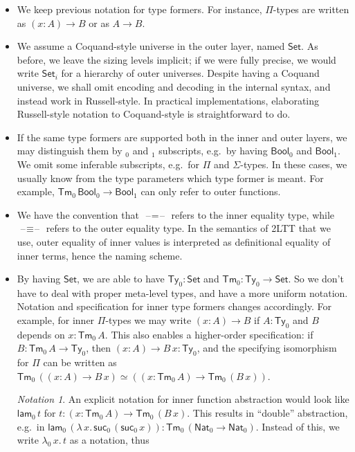 \documentclass[12pt,a4paper,twoside,openany]{book}
\theoremstyle{remark}
\newtheorem{notation}{Notation}
\theoremstyle{definition}
\theoremstyle{theorem}
\newcommand{\ms}[1]{\mathsf{#1}}
\newcommand{\suc}{\ms{suc}}
\newcommand{\Tm}{\mathsf{Tm}}
\newcommand{\Ty}{\mathsf{Ty}}
\newcommand{\blank}{\mathord{\hspace{1pt}\text{--}\hspace{1pt}}}
\newcommand{\Set}{\mathsf{Set}}
\newcommand{\Nat}{\ms{Nat}}
\newcommand{\Bool}{\ms{Bool}}
\newcommand{\lam}{\ms{lam}}
\begin{document}
\begin{itemize}
  \item
    We keep previous notation for type formers. For instance, $\Pi$-types are
    written as $(x : A) \to B$ or as $A \to B$.
  \item
    We assume a Coquand-style universe in the outer layer, named $\Set$. As
    before, we leave the sizing levels implicit; if we were fully precise, we
    would write $\Set_i$ for a hierarchy of outer universes. Despite having a
    Coquand universe, we shall omit encoding and decoding in the internal
    syntax, and instead work in Russell-style. In practical implementations,
    elaborating Russell-style notation to Coquand-style is straightforward to
    do.
  \item
    If the same type formers are supported both in the inner and outer layers, we
    may distinguish them by $_0$ and $_1$ subscripts, e.g.\ by having $\Bool_0$ and
    $\Bool_1$. We omit some inferable subscripts, e.g.\ for $\Pi$ and
    $\Sigma$-types. In these cases, we usually know from the type parameters which
    type former is meant. For example, $\Tm_0\,\Bool_0 \to \Bool_1$ can only refer
    to outer functions.
  \item
    We have the convention that $\blank\!=\!\blank$ refers to the inner equality
    type, while $\blank\!\equiv\!\blank$ refers to the outer equality type. In
    the semantics of 2LTT that we use, outer equality of inner values is
    interpreted as definitional equality of inner terms, hence the naming
    scheme.
  \item
    By having $\Set$, we are able to have $\Ty_0 : \Set$ and $\Tm_0 : \Ty_0 \to
    \Set$. So we don't have to deal with proper meta-level types, and have a
    more uniform notation. Notation and specification for inner type formers
    changes accordingly. For example, for inner $\Pi$-types we may write $(x :
    A) \to B$ if $A : \Ty_0$ and $B$ depends on $x : \Tm_0\,A$. This also
    enables a higher-order specification: if $B : \Tm_0\,A \to \Ty_0$, then $(x
    : A) \to B\,x : \Ty_0$, and the specifying isomorphism for $\Pi$ can be
    written as $\Tm_0\,((x : A) \to B\,x) \simeq ((x : \Tm_0\,A) \to
    \Tm_0\,(B\,x))$.
    \begin{notation}
      An explicit notation for inner function abstraction would look like
      $\lam_0\,t$ for $t : (x : \Tm_0\,A) \to \Tm_0\,(B\,x)$. This results in
      ``double'' abstraction, e.g.\ in
      $\lam_0\,(\lambda\,x.\,\suc_0\,(\suc_0\,x)) : \Tm_0\,(\Nat_0 \to
      \Nat_0)$. Instead of this, we write $\lambda_0\,x.\,t$ as a notation, thus

\end{notation}
\end{itemize}
\end{document}
